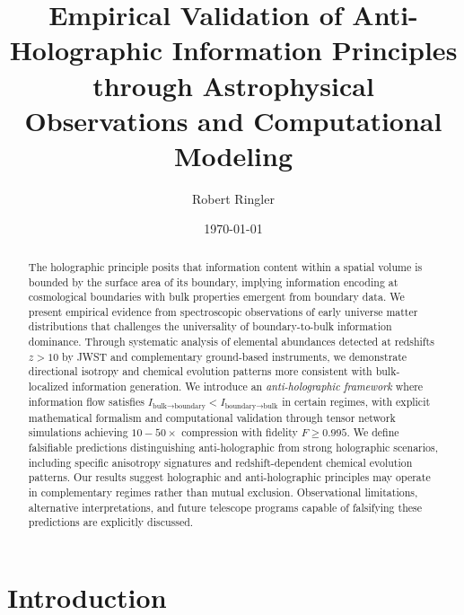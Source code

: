 \documentclass[twocolumn,aps,prd,superscriptaddress,nofootinbib]{revtex4-2}
\begin{document}
\title{Empirical Validation of Anti-Holographic Information Principles through Astrophysical Observations and Computational Modeling}

\author{Robert Ringler}

\date{\today}

\begin{abstract}
The holographic principle posits that information content within a spatial volume is bounded by the surface area of its boundary, implying information encoding at cosmological boundaries with bulk properties emergent from boundary data. We present empirical evidence from spectroscopic observations of early universe matter distributions that challenges the universality of boundary-to-bulk information dominance. Through systematic analysis of elemental abundances detected at redshifts $z > 10$ by JWST and complementary ground-based instruments, we demonstrate directional isotropy and chemical evolution patterns more consistent with bulk-localized information generation. We introduce an \textit{anti-holographic framework} where information flow satisfies $I_{\text{bulk}\to\text{boundary}} < I_{\text{boundary}\to\text{bulk}}$ in certain regimes, with explicit mathematical formalism and computational validation through tensor network simulations achieving $10-50\times$ compression with fidelity $F \geq 0.995$. We define falsifiable predictions distinguishing anti-holographic from strong holographic scenarios, including specific anisotropy signatures and redshift-dependent chemical evolution patterns. Our results suggest holographic and anti-holographic principles may operate in complementary regimes rather than mutual exclusion. Observational limitations, alternative interpretations, and future telescope programs capable of falsifying these predictions are explicitly discussed.
\end{abstract}


\maketitle

\section{Introduction}
\end{document}
